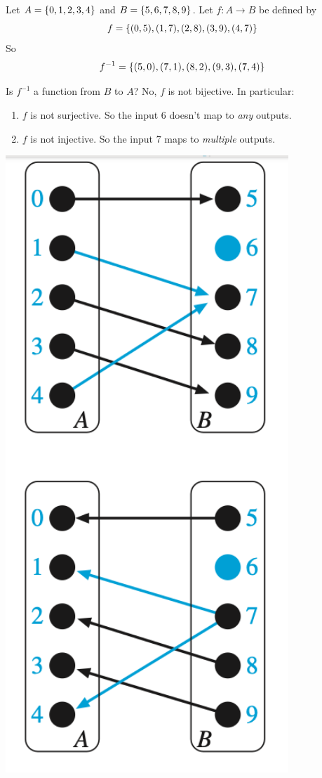 \documentclass[10pt]{beamer}
\begin{document}
\begin{frame}
\begin{minipage}{0.63\textwidth}
 \begin{myredbox}[title=Solution to reading quiz]
 Let $A = \{ {0,1,2,3,4} \}$ and $B=\{ {5,6,7,8,9} \}$. Let $f: A \to B$ be defined by
 \[  f= \{ {(0,5), (1,7), (2,8), (3,9), (4,7)} \}\]
 So 
 \[ f^{-1} = \{ {(5,0), (7,1), (8,2), (9,3), (7,4)} \}\]  
 
Is $f^{-1}$ a function from $B$ to $A$? \pause 
No, $f$ is not bijective.  In particular:
 
\begin{enumerate}
	\item $f$ is not surjective.  So the input $6$ doesn't map to \textit{any} outputs.
	\item $f$ is not injective.  So the input $7$ maps to \textit{multiple} outputs.
\end{enumerate}
\end{myredbox}
\end{minipage}
\hfill 
\begin{minipage}{0.35\textwidth}
\includegraphics[width=0.8\textwidth]{images/reading_quiz_plot.png}	

\end{minipage}
\end{frame}
\end{document}
